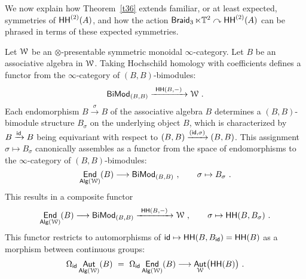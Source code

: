 \documentclass{amsart}
\theoremstyle{definition}
\theoremstyle{remark}
\DeclareMathOperator{\Alg}{\sf Alg}
\DeclareMathOperator{\Aut}{\sf Aut}
\DeclareMathOperator{\End}{\sf End}
\newcommand{\lacts}{\curvearrowright}
\DeclareMathOperator{\fr}{\sf fr}
\def\ot{\otimes}
\newcommand{\w}{\widetilde}
\newcommand{\xra}{\xrightarrow}
\DeclareMathOperator{\Braid}{{\sf Braid}_3}
\DeclareMathOperator{\Ebraid}{\w{\sf E}_{2}^{+}(\ZZ)}
\DeclareMathOperator{\id}{\sf id}
\DeclareMathOperator{\sHH}{\sf HH}
\DeclareMathOperator{\HHt}{{\sf HH}^{(2)}}
\DeclareMathOperator{\Imm}{\sf Imm}
\begin{document}
%
%
%
%






















We now explain how Theorem~\ref{t36} extends familiar, or at least expected, symmetries of $\HHt(A)$, and how the action $\Braid \ltimes \TT^2 \lacts \HHt(A)$ can be phrased in terms of these expected symmetries.  



Let $\mathcal W$ be an $\ot$-presentable symmetric monoidal $\infty$-category. 
Let $B$ be an associative algebra in $\mathcal W$.
Taking Hochschild homology with coefficients defines a functor from the $\infty$-category of $(B,B)$-bimodules:
\[
{\sf BiMod}_{(B,B)}
\xra{~\sHH(B,-)~}
\cW
~.
\]
Each endomorphism $B\xra{\sigma}B$ of the associative algebra $B$ determines a $(B,B)$-bimodule structure $B_\sigma$ on the underlying object $B$, which is characterized by $B\xra{\id}B$ being equivariant with respect to $(B,B)\xra{(\id, \sigma )} (B,B)$.  
This assignment $\sigma\mapsto B_\sigma$ canonically assembles as a functor from the space of endomorphisms to the $\infty$-category of $(B,B)$-bimodules:
\[
\End_{\Alg(\cW)}(B)
\longrightarrow
{\sf BiMod}_{(B,B)}
~,\qquad
\sigma
\mapsto 
B_\sigma
~.
\]
This results in a composite functor
\[
\End_{\Alg(\cW)}(B)
\longrightarrow
{\sf BiMod}_{(B,B)}
\xra{~\sHH(B,-)~}
\cW
~,\qquad
\sigma
\mapsto 
\sHH(B,B_\sigma)
~.
\]
This functor restricts to automorphisms of $\id\mapsto \sHH(B,B_{\id}) = \sHH(B)$ as a morphism between continuous groups:
\begin{equation}
\label{e56}
\Omega_{\id} \Aut_{\Alg(\cW)}(B)
~=~
\Omega_{\id} \End_{\Alg(\cW)}(B)
\longrightarrow
\Aut_{\cW}\bigl( \sHH(B) \bigr)
~.
\end{equation}
\end{document}
